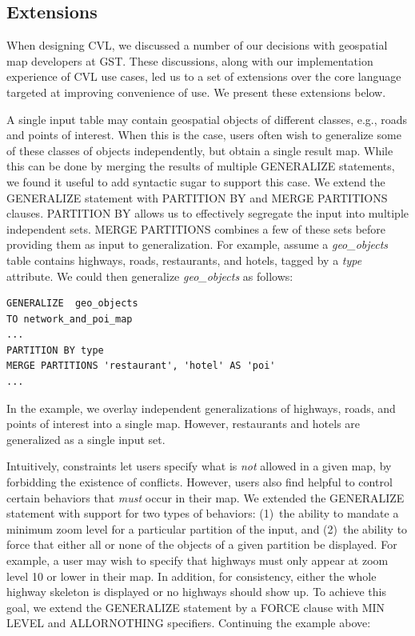 \subsection{Extensions}
\label{sec:implementation:extensions}

When designing CVL, we discussed a number of our decisions with geospatial map developers at GST. These discussions, along with our implementation experience of CVL use cases, led us to a set of extensions over the core language targeted at improving convenience of use. We present these extensions below.

A single input table may contain geospatial objects of different classes, e.g., roads and points of interest. When this is the case, users often wish to generalize some of these classes of objects independently, but obtain a single result map. While this can be done by merging the results of multiple GENERALIZE statements, we found it useful to add syntactic sugar to support this case. We extend the GENERALIZE statement with PARTITION BY and MERGE PARTITIONS clauses. PARTITION BY allows us to effectively segregate the input into multiple independent sets. MERGE PARTITIONS combines a few of these sets before providing them as input to generalization. For example, assume a \emph{geo\_objects} table contains highways, roads, restaurants, and hotels, tagged by a \emph{type} attribute. We could then generalize \emph{geo\_objects} as follows:

\begin{lstlisting}
GENERALIZE  geo_objects
TO network_and_poi_map
...
PARTITION BY type
MERGE PARTITIONS 'restaurant', 'hotel' AS 'poi'
... 
\end{lstlisting}

In the example, we overlay independent generalizations of highways, roads, and points of interest into a single map. However, restaurants and hotels are generalized as a single input set.  

Intuitively, constraints let users specify what is \emph{not} allowed in a given map, by forbidding the existence of conflicts. However, users also find helpful to control certain behaviors that \emph{must} occur in their map. We extended the GENERALIZE statement with support for two types of behaviors: (1)~the ability to mandate a minimum zoom level for a particular partition of the input, and (2)~the ability to force that either all or none of the objects of a given partition be displayed. For example, a user may wish to specify that highways must only appear at zoom level 10 or lower in their map. In addition, for consistency, either the whole highway skeleton is displayed or no highways should show up. To achieve this goal, we extend the GENERALIZE statement by a FORCE clause with MIN LEVEL and ALLORNOTHING specifiers. Continuing the example above:

